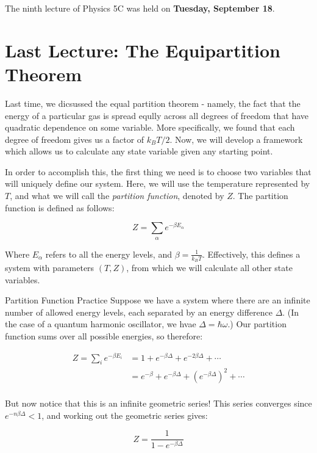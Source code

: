 The ninth lecture of Physics 5C was held on  \textbf{Tuesday, September 18}. 

\section{Last Lecture: The Equipartition Theorem}

Last time, we dicsussed the equal partition theorem - namely, the fact that the energy of a particular gas is spread eqully across all degrees of freedom that have quadratic dependence on some variable. More specifically, we found that each degree of freedom gives us a factor of $k_BT/2$. Now, we will develop a framework which allows us to calculate any state variable given any starting point. 

In order to accomplish this, the first thing we need is to choose two variables that will uniquely define our system. Here, we will use the temperature represented by $T$, and what we will call the \textit{partition function}, denoted by $Z$. The partition function is defined as follows: 

\[ Z = \sum_{\alpha} e^{-\beta E_\alpha}\] 

Where $E_{\alpha}$ refers to all the energy levels, and $\beta = \frac{1}{k_BT}$. Effectively, this defines a system with parameters $(T, Z)$, from which we will calculate all other state variables. 

\begin{example}{Partition Function Practice}{}
    Suppose we have a system where there are an infinite number of allowed energy levels, each separated by an energy difference $\Delta$. (In the case of a quantum harmonic oscillator, we hvae $\Delta = \hbar \omega$.) Our partition function sums over all possible energies, so therefore: 


    \begin{align*}
        Z = \sum_i e^{-\beta E_i} &= 1 + e^{-\beta \Delta} + e^{-2\beta \Delta} + \cdots\\
        &= e^{-\beta} + e^{-\beta \Delta} + \left( e^{-\beta \Delta}\right)^2 + \cdots \\
    \end{align*}

    But now notice that this is an infinite geometric series! This series converges since $e^{-n\beta \Delta} < 1$, and working out the geometric series gives:

    \[ Z = \frac{1}{1-e^{-\beta \Delta}}\]
\end{example}

